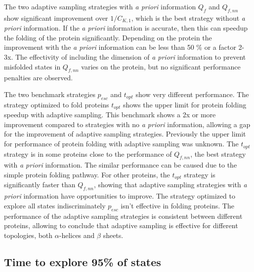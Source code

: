 The two adaptive sampling strategies with \emph{a priori} information $Q_{f}$ and $Q_{f,nn}$ show significant improvement over $1/C_{K, 1}$, which is the best strategy without \emph{a priori} information. If the \emph{a priori} information is accurate, then this can speedup the folding of the protein significantly. Depending on the protein the improvement with the \emph{a priori} information can be less than 50
\% or a factor 2-3x. The effectivity of including the dimension of \emph{a priori} information to prevent misfolded states in  $Q_{f,nn}$ varies on the protein, but no significant performance penalties are observed.

The two benchmark strategies $p_{esc}$ and $t_{opt}$ show very different performance. The strategy optimized to fold proteins $t_{opt}$  shows the upper limit for protein folding speedup with adaptive sampling. This benchmark shows a 2x or more improvement compared to strategies with no \emph{a priori} information, allowing a gap for the improvement of adaptive sampling strategies. Previously the upper limit for performance of protein folding with adaptive sampling was unknown. The $t_{opt}$ strategy is in some proteins close to the performance of $Q_{f,nn}$, the best strategy with \emph{a priori} information. The similar performance can be caused due to the simple protein folding pathway. For other proteins, the $t_{opt}$ strategy is significantly faster than $Q_{f,nn}$, showing that adaptive sampling strategies with \emph{a priori} information have opportunities to improve. The strategy optimized to explore all states indiscriminately $p_{esc}$ isn't effective in folding proteins. The performance of the adaptive sampling strategies is consistent between different proteins, allowing to conclude that adaptive sampling is effective for different topologies, both $\alpha$-helices and $\beta$ sheets.

\subsection{\label{sec:time-explore}Time to explore 95\% of states}

